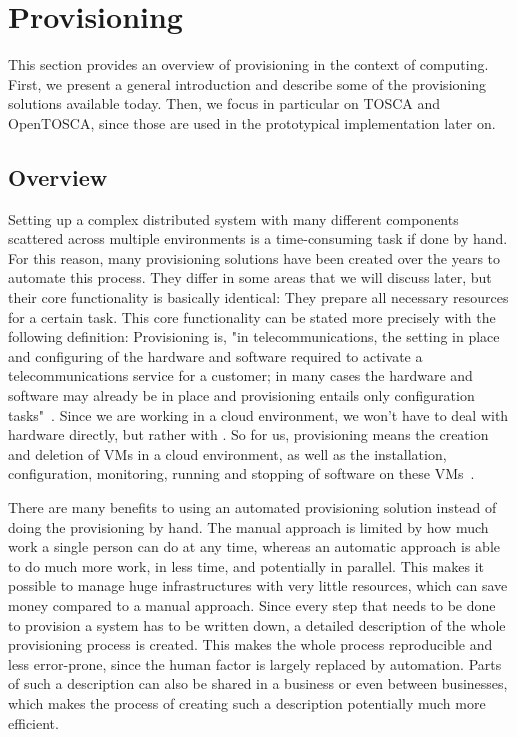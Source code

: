 \section{Provisioning}
\label{fundamentals:provisioning}

This section provides an overview of provisioning in the context of computing.
First, we present a general introduction and describe some of the provisioning solutions available today.
Then, we focus in particular on TOSCA and OpenTOSCA, since those are used in the prototypical implementation later on.

\subsection{Overview}

Setting up a complex distributed system with many different components scattered across multiple environments is a time-consuming task if done by hand.
For this reason, many provisioning solutions have been created over the years to automate this process.
They differ in some areas that we will discuss later, but their core functionality is basically identical: They prepare all necessary resources for a certain task.
This core functionality can be stated more precisely with the following definition: Provisioning is, "in telecommunications, the setting in place and configuring of the hardware and software required to activate a telecommunications service for a customer; in many cases the hardware and software may already be in place and provisioning entails only configuration tasks"~\autocite{def:provisioning}.
Since we are working in a cloud environment, we won't have to deal with hardware directly, but rather with .
So for us, provisioning means the creation and deletion of VMs in a cloud environment, as well as the installation, configuration, monitoring, running and stopping of software on these VMs~\autocite{provisioning:architecture}.

There are many benefits to using an automated provisioning solution instead of doing the provisioning by hand.
The manual approach is limited by how much work a single person can do at any time, whereas an automatic approach is able to do much more work, in less time, and potentially in parallel.
This makes it possible to manage huge infrastructures with very little resources, which can save money compared to a manual approach.
Since every step that needs to be done to provision a system has to be written down, a detailed description of the whole provisioning process is created.
This makes the whole process reproducible and less error-prone, since the human factor is largely replaced by automation.
Parts of such a description can also be shared in a business or even between businesses, which makes the process of creating such a description potentially much more efficient.

